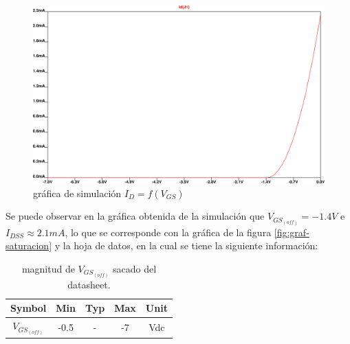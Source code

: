 \documentclass[chaptersright]{informeutn}
\begin{document}
    \begin{figure}[ht!]
        \centering
        \includegraphics[width=0.9\linewidth]{pictures/graf-estrangulamiento.png}
        \caption{gráfica de simulación $I_D = f(V_{GS})$}
    \end{figure}

Se puede observar en la gráfica obtenida de la simulación que $V_{GS_{(off)}} = -1.4V$ e
$I_{DSS} \approx 2.1mA $, lo que se corresponde con la gráfica de la figura \ref{fig:graf-saturacion} 
y la hoja de datos, en la cual se tiene la siguiente información:

\begin{table}[h!]
    \centering
    \begin{tabular}{|c| c c c |c|}
        \hline
        Symbol & Min & Typ & Max & Unit\\
        \hline
        $V_{GS_{(off)}}$ & -0.5 & -  & -7 & Vdc    \\
        \hline
    \end{tabular}
    \caption{magnitud de $V_{GS_{(off)}}$ sacado del datasheet.}
\end{table}
\end{document}
